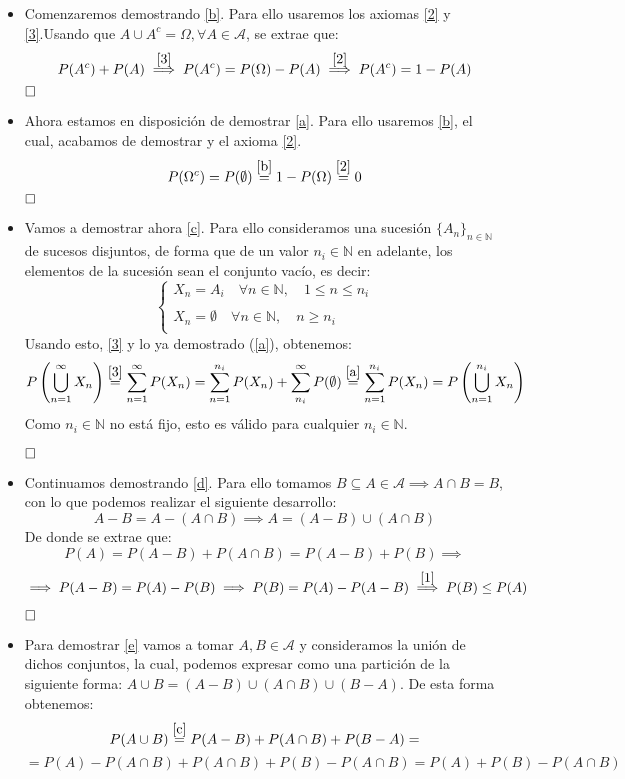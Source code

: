 \documentclass[a4paper, 12pt]{article}
\theoremstyle{plain}
\theoremstyle{definition}
\theoremstyle{remark}
\begin{document}
	\begin{itemize}
		\item Comenzaremos demostrando \ref{b}. Para ello usaremos los axiomas \ref{2} y \ref{3}.Usando que $A\cup A^c=\Omega, \forall A\in \mathcal{A}$, se extrae que:
		\[P(A^c)+P(A) \overset{\ref{3}}{\implies} P(A^c)=P(\Omega)-P(A)\overset{\ref{2}}{\implies} P(A^c)=1-P(A)\]
		$\hfill\square$
		\item Ahora estamos en disposición de demostrar \ref{a}. Para ello usaremos \ref{b}, el cual, acabamos de demostrar y el axioma \ref{2}.
		\[P(\Omega^c)=P(\emptyset) \overset{\ref{b}}{=} 1-P(\Omega) \overset{\ref{2}}{=} 0 \]
		$\hfill\square$
		\item Vamos a demostrar ahora \ref{c}. Para ello consideramos una sucesión $\{A_n\}_{n\in \mathbb{N}}$ de sucesos disjuntos, de  forma que de un valor $n_i \in \mathbb{N}$ en adelante, los elementos de la sucesión sean el conjunto vacío, es decir:
		\[
		\left\{ \begin{array}{lcc}
		X_n=A_i \quad \forall n \in \mathbb{N}, \quad 1\leq n \leq n_i \\
		\\ X_n=\emptyset \quad \forall n \in \mathbb{N}, \quad n \geq n_i   \\
		\end{array}\]
		Usando esto, \ref{3} y lo ya demostrado (\ref{a}), obtenemos:
		\[P\left(\bigcup_{n=1}^{\infty} X_n\right)\overset{\ref{3}}{=}\sum_{n=1}^{\infty}P(X_n)=\sum_{n=1}^{n_i}P(X_n)+\sum_{n_i}^{\infty}P(\emptyset)\overset{\ref{a}}{=}\sum_{n=1}^{n_i}P(X_n)=P\left(\bigcup_{n=1}^{n_i}X_n\right)
		\]
		Como $n_i\in \mathbb{N}$ no está fijo, esto es válido para cualquier $n_i\in \mathbb{N}$.
		
		$\hfill\square$
		\item Continuamos demostrando \ref{d}. Para ello tomamos $B\subseteq A\in \mathcal{A}\implies A\cap B = B$, con lo que podemos realizar el siguiente desarrollo:
		\[A-B=A-(A\cap B) \implies A=(A-B)\cup (A\cap B)
		\]
		De donde se extrae que:
		\[P(A)=P(A-B)+P(A\cap B)=P(A-B)+P(B) \implies \]
		\[\implies P(A-B)=P(A)-P(B) \implies P(B)=P(A)-P(A-B) \overset{\ref{1}}{\implies} P(B) \leq P(A)
		\]
		
		$\hfill\square$
		\item Para demostrar \ref{e} vamos a tomar $A,B\in \mathcal{A}$ y consideramos la unión de dichos conjuntos, la cual, podemos expresar como una partición de la siguiente forma: $A\cup B=(A-B)\cup(A\cap B)\cup (B-A)$. De esta forma obtenemos:
		\[P(A\cup B)\overset{\ref{c}}{=}P(A-B)+P(A\cap B)+P(B-A)=
		\]
		\[=P(A)-P(A\cap B)+P(A\cap B)+P(B)-P(A\cap B)=P(A)+P(B)-P(A\cap B)
		\]
		

\end{itemize}
\end{document}
